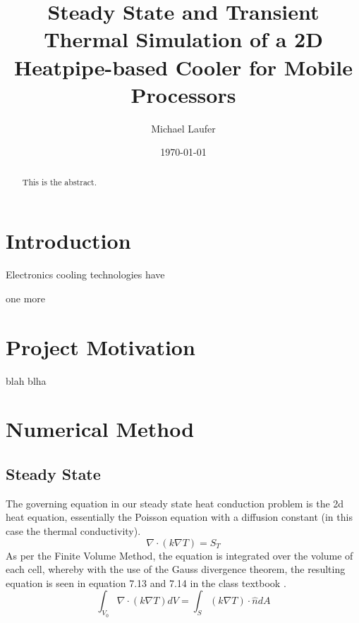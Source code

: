 \documentclass[11pt]{article}
\author{Michael Laufer}
\date{\today}
\title{Steady State and Transient Thermal Simulation of a 2D Heatpipe-based Cooler for Mobile Processors}
\begin{document}
\maketitle
\begin{abstract}

This is the abstract.

\end{abstract}

\section{Introduction}
\label{sec:org595fbf9}

Electronics cooling  technologies have \cite{versteeg1995introduction} 

one more  
\section{Project Motivation}
\label{sec:orgedad357}
blah blha 
\section{Numerical Method}
\label{sec:orgd064d2e}
\subsection{Steady State}
\label{sec:org1956150}
The governing equation in our steady state heat conduction problem is the 2d heat equation, essentially the Poisson equation with a diffusion constant (in this case the thermal conductivity).
\[
\nabla \cdot ( k \nabla T ) = S_{T}
\]
As per the Finite Volume Method, the equation is integrated over the volume of each cell, whereby with the use of the Gauss divergence theorem, the resulting equation is seen in equation 7.13 and 7.14 in the class textbook \cite{mazumder2015numerical}.
\[
\int_{V_{0}} \nabla \cdot ( k \nabla T ) dV =  \int_{S} ( k \nabla T ) \cdot \hat{n} dA
\]
\end{document}
